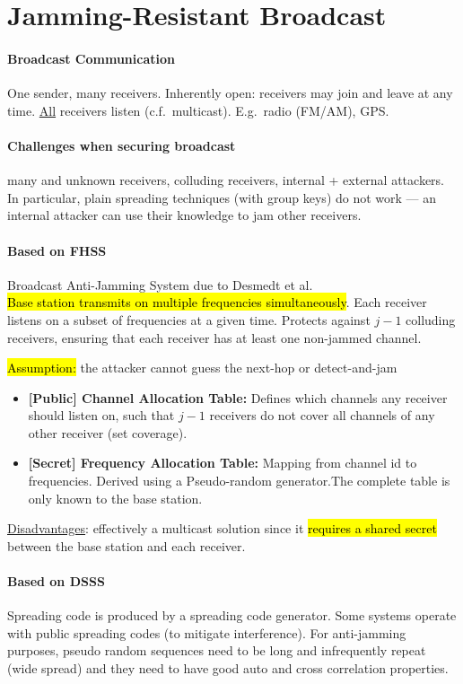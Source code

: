 \section{Jamming-Resistant Broadcast}

\paragraph{Broadcast Communication}
One sender, many receivers. Inherently open: receivers may join and leave at any time. \underline{All} receivers listen (c.f.\ multicast). E.g.\ radio (FM/AM), GPS.\@

\paragraph{Challenges when securing broadcast}
many and unknown receivers, colluding receivers, internal + external attackers.
In particular, plain spreading techniques (with group keys) do not work --- an internal attacker can use their knowledge to jam other receivers.

\paragraph{Based on FHSS}
Broadcast Anti-Jamming System due to Desmedt et al. \\
\hl{Base station transmits on multiple frequencies simultaneously}.
Each receiver listens on a subset of frequencies at a given time.
Protects against $j-1$ colluding receivers, ensuring that each receiver has at least one non-jammed channel.

\hl{Assumption:} the attacker cannot guess the next-hop or detect-and-jam

\begin{itemize}
	\item \textbf{[Public] Channel Allocation Table:}
	Defines which channels any receiver should listen on, such that $j-1$ receivers do not cover all channels of any other receiver (set coverage).
	\item \textbf{[Secret] Frequency Allocation Table:}
	Mapping from channel id to frequencies. Derived using a Pseudo-random generator.\@ The complete table is only known to the base station.
\end{itemize}

\underline{Disadvantages}:
effectively a multicast solution since it \hl{requires a shared secret} between the base station and each receiver.

\paragraph{Based on DSSS}
Spreading code is produced by a spreading code generator. Some systems operate with public spreading codes (to mitigate interference). For anti-jamming purposes, pseudo random sequences need to be long and infrequently repeat (wide spread) and they need to have good auto and cross correlation properties.


